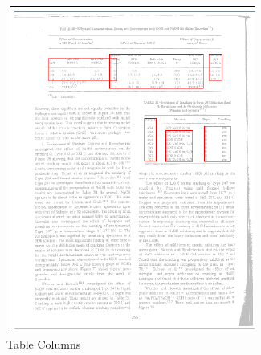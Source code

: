 \begin{figure}[H]
\begin{subfigure}{0.31\textwidth}
\includegraphics[width=\linewidth]{img/tableDetectionTabCols.pdf}
\caption{Table Columns} \label{fig:1c}
\end{subfigure}
\hspace*{\fill} %
\begin{subfigure}{0.31\textwidth}

\end{subfigure}
\end{figure}
